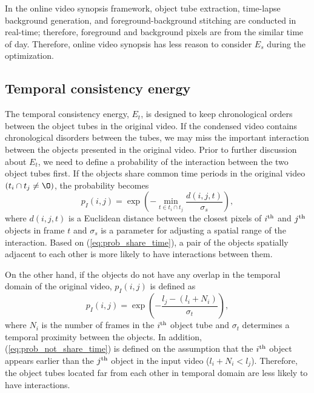 \documentclass[11pt]{hyu_thesis}
\begin{document}
In the online video synopsis framework, object tube extraction, time-lapse background generation, and foreground-background stitching are conducted in real-time; therefore, foreground and background pixels are from the similar time of day. Therefore, online video synopsis has less reason to consider $E_s$ during the optimization.

\subsection{Temporal consistency energy}
The temporal consistency energy, $E_t$, is designed to keep chronological orders between the object tubes in the original video. If the condensed video contains chronological disorders between the tubes, we may miss the important interaction between the objects presented in the original video. Prior to further discussion about $E_t$, we need to define a probability of the interaction between the two object tubes first. If the objects share common time periods in the original video $(t_i \cap t_j \neq \O)$, the probability becomes
\begin{equation}
\label{eq:prob_share_time}
p_I(i, j) = 
\exp\left(-\min_{t \in t_i \cap t_j} \frac{d(i,j,t)}{\sigma_s}\right),
\end{equation}
where $d(i,j,t)$ is a Euclidean distance between the closest pixels of $i^{\rm{th}}$ and $j^{\rm{th}}$ objects in frame $t$ and $\sigma_s$ is a parameter for adjusting a spatial range of the interaction. Based on (\ref{eq:prob_share_time}), a pair of the objects spatially adjacent to each other is more likely to have interactions between them.

On the other hand, if the objects do not have any overlap in the temporal domain of the original video, $p_I(i,j)$ is defined as
\begin{equation}
\label{eq:prob_not_share_time}
p_I(i,j)=\exp\left(-\frac{l_j - (l_i + N_i)}{\sigma_t}\right),
\end{equation}
where $N_i$ is the number of frames in the $i^{\rm{th}}$ object tube and $\sigma_t$ determines a temporal proximity between the objects. In addition, (\ref{eq:prob_not_share_time}) is defined on the assumption that the $i^{\rm{th}}$ object appears earlier than the $j^{\rm{th}}$ object in the input video ($l_i + N_i < l_j$). Therefore, the object tubes located far from each other in temporal domain are less likely to have interactions.
\end{document}
